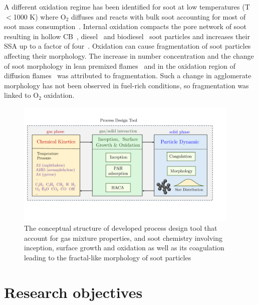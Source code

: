A different oxidation regime has been identified for soot at low temperatures (T$<$1000 K) where $\mathrm{O_2}$ diffuses and reacts with bulk soot accounting for most of soot mass consumption~\citep{ma2013soot}.  Internal oxidation compacts the pore network of soot resulting in hollow CB~\citep{kelesidis2022porosity}, diesel~\cite{ishiguro1991microstructural} and biodiesel~\citep{song2006examination} soot particles and increases their SSA up to a factor of four~\cite{ishiguro1991microstructural}. Oxidation can cause fragmentation of soot particles affecting their morphology. The increase in number concentration and the change of soot morphology in lean premixed flames~\citep{xu1997soot} and in the oxidation region of diffusion flames~\citep{puri1993aerosol} was attributed to fragmentation. Such a change in agglomerate morphology has not been observed in fuel-rich conditions, so fragmentation was linked to $\mathrm{O_2}$ oxidation.



\begin{figure}[!htbp]
	\centering
	\includegraphics[height=60mm, ]{Figures/Introduction/tooldesign.pdf}
	\caption{The conceptual structure of developed process design tool that account for gas mixture properties, and soot chemistry involving inception, surface growth and oxidation as well as its coagulation leading to the fractal-like morphology of soot particles}
	\label{fig:tooldesign}
\end{figure}

\section{Research objectives}

